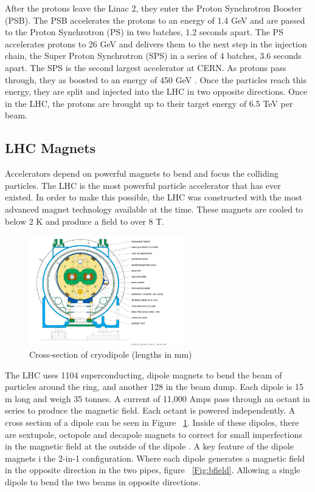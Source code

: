 \indent After the protons leave the Linac 2, they enter the Proton Synchrotron Booster (PSB)\cite{Reich}. The PSB accelerates the protons to an energy of 1.4 GeV and are passed to the Proton Synchrotron (PS) in two batches, 1.2 seconds apart. The PS accelerates protons to 26 GeV and delivers them to the next step in the injection chain, the Super Proton Synchrotron (SPS) in a series of 4 batches, 3.6 seconds apart. The SPS is the second largest accelerator at CERN. As protons pass through, they as boosted to an energy of 450 GeV \cite{Brianti:340514}. Once the particles reach this energy, they are split and injected into the LHC in two opposite directions. Once in the LHC, the protons are brought up to their target energy of 6.5 TeV per beam.
\subsection{LHC Magnets} 
Accelerators depend on powerful magnets to bend and focus the colliding particles. The LHC is the most powerful particle accelerator that has ever existed. In order to make this possible, the LHC was constructed with the most advanced magnet technology available at the time. These magnets are cooled to below 2 K and produce a field to over 8 T.\linebreak
\begin{figure}[h]
\begin{center}
\includegraphics*[width=0.60\textwidth] {figures/Cross-section-of-a-LHC-superconducting-cryodipole-85}%
\caption[Cross-section of cryodipole (lengths in mm)]{Cross-section of cryodipole (lengths in mm)}
\label{fig:cryo_cross}
\end{center}
\end{figure}

\indent The LHC uses 1104 superconducting, dipole magnets to bend the beam of particles around the ring, and another 128 in the beam dump.  Each dipole is 15 m long and weigh 35 tonnes. A current of 11,000 Amps pass through an octant in series to produce the magnetic field. Each octant is powered independently. A cross section of a dipole can be seen in Figure ~\ref{fig:cryo_cross}. Inside of these dipoles, there are sextupole, octopole and decapole magnets to correct for small imperfections in the magnetic field at the outside of the dipole \cite{Evans_2008}. A key feature of the dipole magnets i the 2-in-1 configuration. Where each dipole generates a magnetic field in the opposite direction in the two pipes, figure ~\ref{Fig:bfield}. Allowing a single dipole to bend the two beams in opposite directions.  \linebreak

